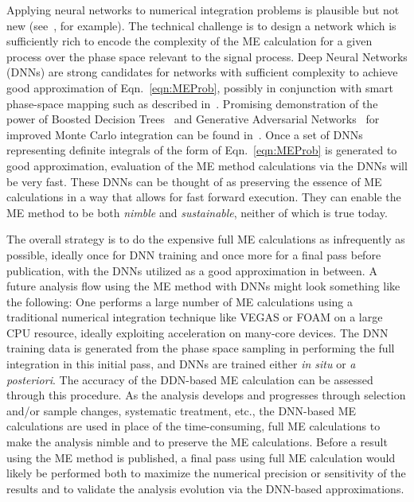 Applying neural networks to numerical integration problems is plausible but not new (see~\cite{CSEarticle2006,TICNC4344207,IJMC2013}, for example). The technical challenge is to design a network which is sufficiently rich to encode the complexity of the ME calculation for a given process over the phase space relevant to the signal process. Deep Neural Networks (DNNs) are strong candidates for networks with sufficient complexity to achieve good approximation of Eqn.~\ref{eqn:MEProb}, possibly in conjunction with smart phase-space mapping such as described in~\cite{Artoisenet:2010cn}. Promising demonstration of the power of Boosted Decision Trees~\cite{friedman2000,friedman2001} and Generative Adversarial Networks~\cite{GAN2014arXiv1406.2661G} for improved Monte Carlo integration can be found in~\cite{Bendavid:2017zhk}. Once a set of DNNs representing definite integrals of the form of Eqn.~\ref{eqn:MEProb} is generated to good approximation, evaluation of the ME method calculations via the DNNs will be very fast. These DNNs can be thought of as preserving the essence of ME calculations in a way that allows for fast forward execution. They can enable the ME method to be both \emph{nimble} and \emph{sustainable}, neither of which is true today.

The overall strategy is to do the expensive full ME calculations as infrequently as possible, ideally once for DNN training and once more for a final pass before publication, with the DNNs utilized as a good approximation in between. A future analysis flow using the ME method with DNNs might look something like the following: One performs a large number of ME calculations using a traditional numerical integration technique like {\sf VEGAS} or {\sf FOAM} on a large CPU resource, ideally exploiting acceleration on many-core devices. The DNN training data is generated from the phase space sampling in performing the full integration in this initial pass, and DNNs are trained either \emph{in situ} or \emph{a posteriori}. The accuracy of the DDN-based ME calculation can be assessed through this procedure. As the analysis develops and progresses through selection and/or sample changes, systematic treatment, etc., the DNN-based ME calculations are used in place of the time-consuming, full ME calculations to make the analysis nimble and to preserve the ME calculations. Before a result using the ME method is published, a final pass using full ME calculation would likely be performed both to maximize the numerical precision or sensitivity of the results and to validate the analysis evolution via the DNN-based approximations.

